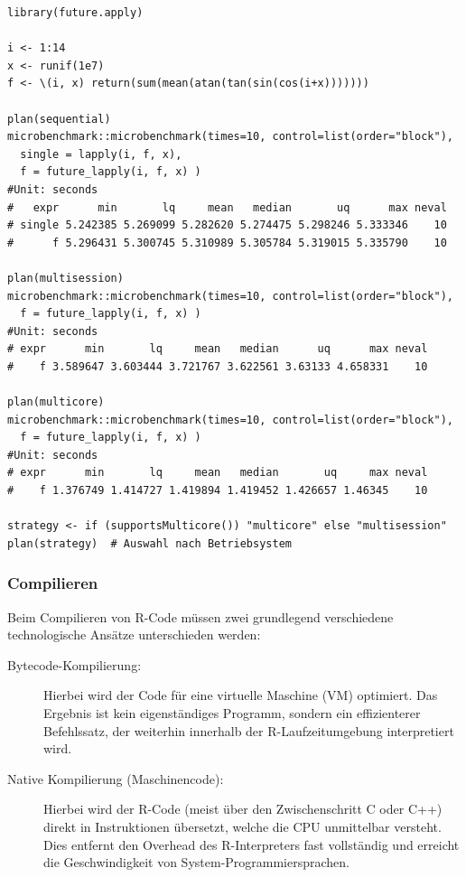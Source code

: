\documentclass[10pt,twocolumn]{scrartcl}
\begin{document}
\begin{lstlisting}[basicstyle=\fontsize{9.3pt}{9.7pt}\selectfont\ttfamily]
library(future.apply)

i <- 1:14
x <- runif(1e7)
f <- \(i, x) return(sum(mean(atan(tan(sin(cos(i+x)))))))

plan(sequential)
microbenchmark::microbenchmark(times=10, control=list(order="block"),
  single = lapply(i, f, x),
  f = future_lapply(i, f, x) )
#Unit: seconds
#   expr      min       lq     mean   median       uq      max neval
# single 5.242385 5.269099 5.282620 5.274475 5.298246 5.333346    10
#      f 5.296431 5.300745 5.310989 5.305784 5.319015 5.335790    10

plan(multisession)
microbenchmark::microbenchmark(times=10, control=list(order="block"),
  f = future_lapply(i, f, x) )
#Unit: seconds
# expr      min       lq     mean   median      uq      max neval
#    f 3.589647 3.603444 3.721767 3.622561 3.63133 4.658331    10

plan(multicore)
microbenchmark::microbenchmark(times=10, control=list(order="block"),
  f = future_lapply(i, f, x) )
#Unit: seconds
# expr      min       lq     mean   median       uq     max neval
#    f 1.376749 1.414727 1.419894 1.419452 1.426657 1.46345    10

strategy <- if (supportsMulticore()) "multicore" else "multisession"
plan(strategy)  # Auswahl nach Betriebsystem
\end{lstlisting}


\subsubsection{Compilieren}

Beim Compilieren von R-Code müssen zwei grundlegend verschiedene technologische Ansätze unterschieden werden:

\begin{description}
\item[Bytecode-Kompilierung:] Hierbei wird der Code für eine virtuelle Maschine (VM) optimiert. Das Ergebnis ist kein eigenständiges Programm, sondern ein effizienterer Befehlssatz, der weiterhin innerhalb der R-Laufzeitumgebung interpretiert wird.
\item[Native Kompilierung (Maschinencode):] Hierbei wird der R-Code (meist über den Zwischenschritt C oder C++) direkt in Instruktionen übersetzt, welche die CPU unmittelbar versteht. Dies entfernt den Overhead des R-Interpreters fast vollständig und erreicht die Geschwindigkeit von System-Programmiersprachen.
\end{description}
\end{document}
